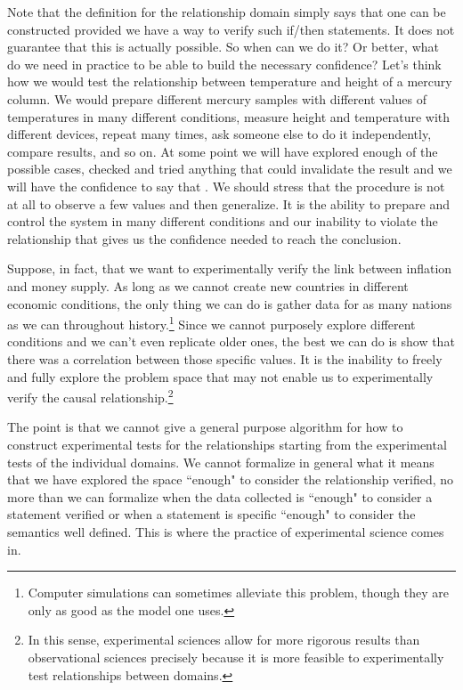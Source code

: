 \documentclass[11pt,letterpaper,fleqn]{memoir} %
\begin{document}
Note that the definition for the relationship domain simply says that one can be constructed provided we have a way to verify such if/then statements. It does not guarantee that this is actually possible. So when can we do it? Or better, what do we need in practice to be able to build the necessary confidence? Let's think how we would test the relationship between temperature and height of a mercury column. We would prepare different mercury samples with different values of temperatures in many different conditions, measure height and temperature with different devices, repeat many times, ask someone else to do it independently, compare results, and so on. At some point we will have explored enough of the possible cases, checked and tried anything that could invalidate the result and we will have the confidence to say that . We should stress that the procedure is not at all to observe a few values and then generalize. It is the ability to prepare and control the system in many different conditions and our inability to violate the relationship that gives us the confidence needed to reach the conclusion.

Suppose, in fact, that we want to experimentally verify the link between inflation and money supply. As long as we cannot create new countries in different economic conditions, the only thing we can do is gather data for as many nations as we can throughout history.\footnote{Computer simulations can sometimes alleviate this problem, though they are only as good as the model one uses.} Since we cannot purposely explore different conditions and we can't even replicate older ones, the best we can do is show that there was a correlation between those specific values. It is the inability to freely and fully explore the problem space that may not enable us to experimentally verify the causal relationship.\footnote{In this sense, experimental sciences allow for more rigorous results than observational sciences precisely because it is more feasible to experimentally test relationships between domains.}

The point is that we cannot give a general purpose algorithm for how to construct experimental tests for the relationships starting from the experimental tests of the individual domains. We cannot formalize in general what it means that we have explored the space ``enough" to consider the relationship verified, no more than we can formalize when the data collected is ``enough" to consider a statement verified or when a statement is specific ``enough" to consider the semantics well defined. This is where the practice of experimental science comes in.
\end{document}
